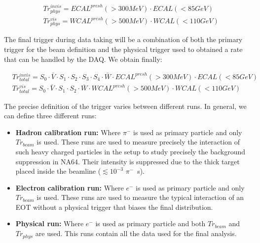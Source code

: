 \begin{equation}
\label{eq:trigger-phys}
\begin{split}
& Tr^{invis}_{phys} = ECAL^{presh}(>300 MeV) \cdot ECAL(<85 GeV)\\
& Tr^{vis}_{phys} = WCAL^{presh}(>500 MeV) \cdot WCAL(<110 GeV)
\end{split}
\end{equation}

The final trigger during data taking will be a combination of both the primary trigger for the beam definition and the physical trigger used to obtained a rate that can be handled by the DAQ. We obtain finally:

\begin{equation}
\label{eq:trigger-total}
\begin{split}
& Tr^{invis}_{total} = S_0 \cdot \bar{V} \cdot S_1 \cdot S_2 \cdot S_3 \cdot S_4 \cdot \bar{W} \cdot ECAL^{presh}(>300 MeV) \cdot ECAL(<85 GeV)\\
& Tr^{vis}_{total} = S_0 \cdot \bar{V} \cdot S_1 \cdot S_2\cdot \bar{W} \cdot WCAL^{presh}(>500 MeV) \cdot WCAL(<110 GeV)
\end{split}
\end{equation}

The precise definition of the trigger varies between different runs. In general, we can define three different runs:

\begin{itemize}
\item \textbf{Hadron calibration run:} Where $\pi^-$ is used as primary particle and only $Tr_{beam}$ is used. These runs are used to measure precisely the interaction of such heavy charged particles in the setup to study precisely the background suppression in NA64. Their intensity is suppressed due to the thick target placed inside the beamline ($\lesssim 10^{-3}$ $\pi^-$\si{\per\second}).
\item \textbf{Electron calibration run:} Where $e^-$ is used as primary particle and only $Tr_{beam}$ is used. These runs are used to measure the typical interaction of an EOT without a physical trigger that biases the final distribution. 
\item \textbf{Physical run:} Where $e^-$ is used as primary particle and both $Tr_{beam}$ and $Tr_{phys}$ are used. This runs contain all the data used for the final analysis. 
\end{itemize}

